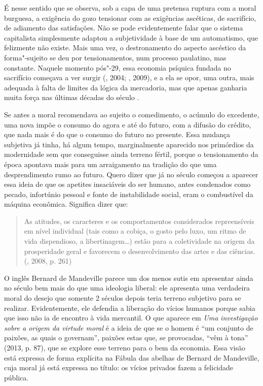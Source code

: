 {É nesse sentido que se observa, sob a capa de uma pretensa ruptura com a
moral burguesa, a exigência do gozo tensionar com as exigências
ascéticas, de sacrifício, de adiamento das satisfações. Não se pode
evidentemente falar que o sistema capitalista simplesmente adaptou a
subjetividade à base de um automatismo, que felizmente não existe. Mais
uma vez, o destronamento do aspecto ascéstico da forma"-sujeito se deu
por tensionamentos, num processo paulatino, mas constante. Naquele
momento pós"-29, essa economia psíquica fundada no sacrifício começava a
ver surgir (, 2004; , 2009), e a ela se opor, uma outra,
mais adequada à falta de limites da lógica da mercadoria, mas que apenas
ganharia muita força nas últimas décadas do século .

Se antes a moral recomendava ao sujeito o comedimento, o acúmulo do
excedente, uma nova impõe o consumo do agora e até do futuro, com a
difusão do crédito, que nada mais é do que o consumo do futuro no
presente. Essa mudança subjetiva já tinha, há algum tempo, marginalmente
aparecido nos primórdios da modernidade sem que conseguisse ainda
terreno fértil, porque o tensionamento da época apontava mais para um
arraigamento na tradição do que uma desprendimento rumo ao futuro. Quero
dizer que já no século  começou a aparecer essa ideia de que os
apetites insaciáveis do ser humano, antes condenados como pecado,
infortúnio pessoal e fonte de instabilidade social, eram o combustível
da máquina econômica. Significa dizer que:

\begin{quote}
As atitudes, os caracteres e os comportamentos considerados
repreensíveis em nível individual (tais como a cobiça, o gosto pelo
luxo, um ritmo de vida dispendioso, a libertinagem\ldots{}) estão para a
coletividade na origem da prosperidade geral e favorecem o
desenvolvimento das artes e das ciências. (, 2008, p. 261)
\end{quote}

O inglês Bernard de Mandeville parece um dos menos sutis em apresentar
ainda no século  bem mais do que uma ideologia liberal: ele
apresenta uma verdadeira moral do desejo que somente 2 séculos depois
teria terreno subjetivo para se realizar. Evidentemente, ele defendia a
liberação do vícios humanos porque sabia que isso não ia de encontro à
vida mercantil. O que aparece em \emph{Uma} \emph{investigação sobre a
origem da virtude moral} é a ideia de que se o homem é ``um conjunto de
paixões, as quais o governam'', paixões estas que, se provocadas, ``vêm
à tona'' (2013, p. 87), que se explore esse terreno para o bem da
economia. Essa visão está expressa de forma explícita na Fábula das
abelhas de Bernard de Mandeville, cuja moral já está expressa no título:
os vícios privados fazem a felicidade pública.

}
